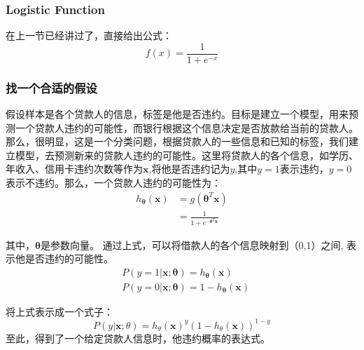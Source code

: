 \documentclass[a4paper,12pt]{book}
\begin{document}
    \subsubsection{Logistic Function}
    在上一节已经讲过了，直接给出公式：
    \begin{equation}
        f(x) = \frac{1}{1+e^{-x}}
    \end{equation}

    \subsubsection{找一个合适的假设}
    假设样本是各个贷款人的信息，标签是他是否违约。目标是建立一个模型，用来预测一个贷款人违约的可能性，而银行根据这个信息决定是否放款给当前的贷款人。那么，很明显，这是一个分类问题，根据贷款人的一些信息和已知的标签，我们建立模型，去预测新来的贷款人违约的可能性。这里将贷款人的各个信息，如学历、年收入、信用卡违约次数等作为$\boldsymbol{x}$,将他是否违约记为$y$,其中$y=1$表示违约，$y=0$表示不违约。那么，一个贷款人违约的可能性为：
    \begin{equation}
        \begin{aligned}
            h_{\boldsymbol{\theta}}(\boldsymbol{x})&=g(\boldsymbol{\theta}^T\boldsymbol{x}) \\
            &= \frac{1}{1+e^{-\boldsymbol{\theta}^T\boldsymbol{x}}}
        \end{aligned}
    \end{equation}


    其中，$\boldsymbol{\theta}$是参数向量。
    通过上式，可以将借款人的各个信息映射到（0,1）之间,
    表示他是否违约的可能性。
    \begin{equation}
        \begin{aligned}
            &P(y=1|\boldsymbol{x}; \boldsymbol{\theta}) = h_{\boldsymbol{\theta}}(\boldsymbol{x})\\
            &P(y=0|\boldsymbol{x}; \boldsymbol{\theta}) = 1 - h_{\boldsymbol{\theta}}(\boldsymbol{x})
        \end{aligned}
    \end{equation}

    将上式表示成一个式子：
    $$
    P(y|\boldsymbol{x}; \theta) = h_{\theta}(\boldsymbol{x})^y(1-h_{\theta}(\boldsymbol{x}))^{1-y}
    $$
    至此，得到了一个给定贷款人信息时，他违约概率的表达式。
\end{document}
